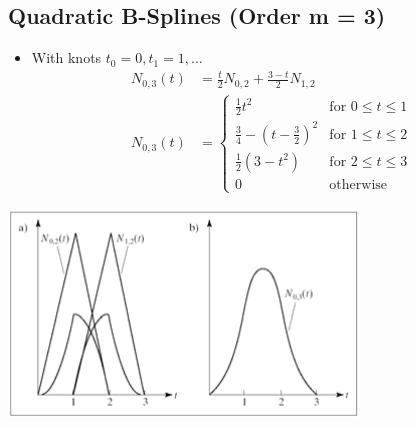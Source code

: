 \documentclass{article}
\begin{document}
\subsection*{Quadratic B-Splines (Order m = 3)}
\begin{itemize}
    \item With knots $t_0 = 0, t_1 = 1, \dots$
    \begin{align*}
        N_{0, 3}(t) &= \frac{t}{2} N_{0, 2} + \frac{3 - t}{2}N_{1, 2}\\
        N_{0, 3}(t) &= \begin{cases} \frac{1}{2}t^2 & \text{for } 0 \leq t \leq 1 \\ \frac{3}{4} - (t - \frac{3}{2})^2 & \text{for } 1 \leq t \leq 2 \\ \frac{1}{2}(3 - t^2) & \text{for } 2 \leq t \leq 3 \\ 0 & \text{otherwise}\end{cases}
    \end{align*}
\end{itemize}
\begin{center}
    \includegraphics*[scale=0.8]{W3_16.png}
\end{center}
\end{document}
